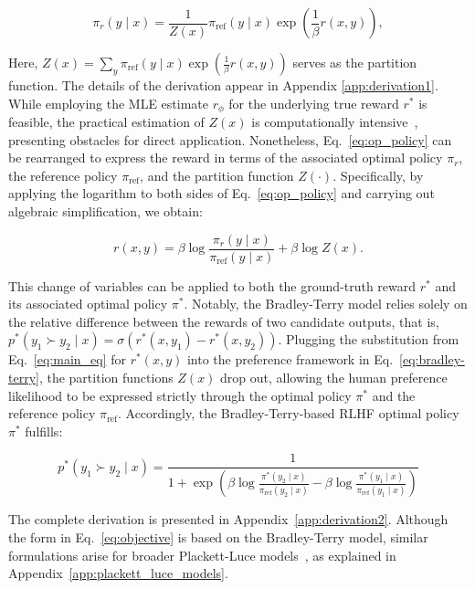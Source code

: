 \begin{equation}\label{eq:op_policy}
    \pi_r(y\mid x) = \frac{1}{Z(x)}\pi_\text{ref}(y\mid x)\exp\left(\frac{1}{\beta}r(x, y)\right),
\end{equation}

Here, $Z(x) =\sum_{y}\pi_\text{ref}(y\mid x)\exp\left(\frac{1}{\beta}r(x, y)\right)$ serves as the partition function. The details of the derivation appear in Appendix \ref{app:derivation1}. While employing the MLE estimate $r_{\phi}$ for the underlying true reward $r^*$ is feasible, the practical estimation of $Z(x)$ is computationally intensive~\citep{korbak2022reinforcement, go2023aligning}, presenting obstacles for direct application. Nonetheless, Eq.~\ref{eq:op_policy} can be rearranged to express the reward in terms of the associated optimal policy $\pi_r$, the reference policy $\pi_\text{ref}$, and the partition function $Z(\cdot)$. Specifically, by applying the logarithm to both sides of Eq.~\ref{eq:op_policy} and carrying out algebraic simplification, we obtain:

\begin{equation}\label{eq:main_eq}
    r(x,y) =\beta \log \frac{\pi_r(y\mid x)}{\pi_\text{ref}(y\mid x)} + \beta \log Z(x).
\end{equation}

This change of variables can be applied to both the ground-truth reward $r^*$ and its associated optimal policy $\pi^*$. Notably, the Bradley-Terry model relies solely on the relative difference between the rewards of two candidate outputs, that is, ${p^*(y_1 \succ y_2 \mid x) = \sigma(r^*(x, y_1) - r^*(x, y_2))}$. Plugging the substitution from Eq.~\ref{eq:main_eq} for $r^*(x,y)$ into the preference framework in Eq.~\ref{eq:bradley-terry}, the partition functions $Z(x)$ drop out, allowing the human preference likelihood to be expressed strictly through the optimal policy $\pi^*$ and the reference policy $\pi_\text{ref}$. Accordingly, the Bradley-Terry-based RLHF optimal policy $\pi^*$ fulfills:

\begin{equation}\label{eq:objective}
    p^*(y_1\succ y_2 \mid x)=\frac{1}{1 + \exp\left(\beta \log \frac{\pi^*(y_2\mid x)}{\pi_\text{ref}(y_2\mid x)} - \beta \log \frac{\pi^*(y_1\mid x)}{\pi_\text{ref}(y_1\mid x)}\right)}
\end{equation}

The complete derivation is presented in Appendix~\ref{app:derivation2}. Although the form in Eq.~\ref{eq:objective} is based on the Bradley-Terry model, similar formulations arise for broader Plackett-Luce models~\citep{plackett1975analysis, luce2012individual}, as explained in Appendix~\ref{app:plackett_luce_models}.

